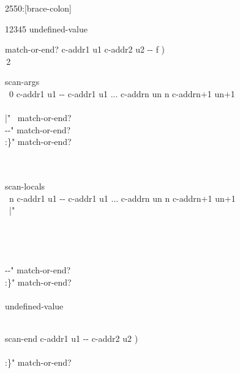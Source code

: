 \begin{worddef}[b:]{2550}{\brace:}[brace-colon]
	\begin{implement} %
12345  undefined-value

\word{:} match-or-end?  c-addr1 u1 c-addr2 u2 -{}- f ) \\
\tab\,2        \word{;}

\word{:} scan-args \\
\tab\, 0 c-addr1 u1 -{}- c-addr1 u1 ... c-addrn un n c-addrn+1 un+1\\
\tab\, \\
\tab[2]	  |"   ~match-or-end?   \\
\tab[2]	  -{}-" match-or-end?   \\
\tab[2]	  :\}"  match-or-end?   \\
\tab[2]	   \\
\tab\,    \word{;}

\word{:} scan-locals \\
\tab\, n c-addr1 u1 -{}- c-addr1 u1 ... c-addrn un n c-addrn+1 un+1 \\
\tab\,  |"     \\
\tab[2]	 \\
\tab\, \\
\tab\,  \\
\tab\, \\
\tab[2]	  -{}-" match-or-end?   \\
\tab[2]	  :\}"  match-or-end?   \\
\tab[2]	   \\
\tab[2]	 undefined-value \\
\tab\,   \word{;}

\word{:} scan-end  c-addr1 u1 -{}- c-addr2 u2 ) \\
\tab\, \\
\tab[2]	  :\}" match-or-end?   \\
\tab[2]	  \\
\tab\, \word{;}


\end{implement}
\end{worddef}
